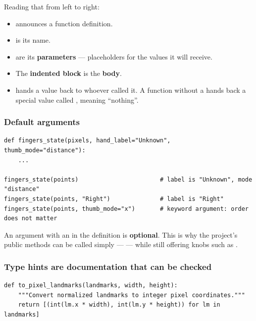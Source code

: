 Reading that from left to right:

\begin{itemize}
  \item {} announces a function definition.
  \item {} is its name.
  \item {} are its \textbf{parameters} --- placeholders for the values it will receive.
  \item The \textbf{indented block} is the \textbf{body}.
  \item {} hands a value back to whoever called it. A function without a 
        hands back a special value called , meaning ``nothing''.
\end{itemize}

\subsubsection*{Default arguments}

\begin{codecard}
\begin{lstlisting}
def fingers_state(pixels, hand_label="Unknown", thumb_mode="distance"):
    ...

fingers_state(points)                       # label is "Unknown", mode "distance"
fingers_state(points, "Right")              # label is "Right"
fingers_state(points, thumb_mode="x")       # keyword argument: order does not matter
\end{lstlisting}
\end{codecard}

An argument with an \code{=} in the definition is \textbf{optional}. This is why the project's
public methods can be called simply ---  --- while still
offering knobs such as .

\subsubsection*{Type hints are documentation that can be checked}

\begin{codecard}
\begin{lstlisting}
def to_pixel_landmarks(landmarks, width, height):
    """Convert normalized landmarks to integer pixel coordinates."""
    return [(int(lm.x * width), int(lm.y * height)) for lm in landmarks]
\end{lstlisting}
\end{codecard}

